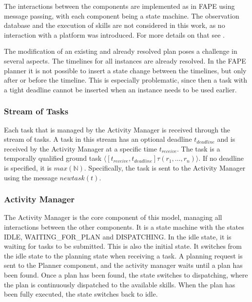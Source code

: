 
The interactions between the components are implemented as in FAPE using message passing, with each component being a state machine.
The observation database and the execution of skills are not considered in this work, as no interaction with a platform was introduced.
For more details on that see \cite{bit-monnotTemporalHierarchicalModels2016a}.

The modification of an existing and already resolved plan poses a challenge in several aspects.
The timelines for all instances are already resolved.
In the FAPE planner it is not possible to insert a state change between the timelines, but only after or before the timeline.
This is especially problematic, since then a task with a tight deadline cannot be inserted when an instance needs to be used earlier.

\subsubsection{Stream of Tasks}

Each task that is managed by the Activity Manager is received through the stream of tasks.
A task in this stream has an optional deadline $t_{deadline}$ and is received by the Activity Manager at a specific time $t_{receive}$.
The task is a temporally qualified ground task $\langle[t_{receive},t_{deadline}] \tau(r_1,\dots,r_n)\rangle$.
If no deadline is specified, it is $max(\mathbb{N})$.
Specifically, the task is sent to the Activity Manager using the message $newtask(t)$.

\subsubsection{Activity Manager}

The Activity Manager is the core component of this model, managing all interactions between the other components.
It is a state machine with the states IDLE, WAITING\_FOR\_PLAN and DISPATCHING.
In the idle state, it is waiting for tasks to be submitted.
This is also the initial state.
It switches from the idle state to the planning state when receiving a task.
A planning request is sent to the Planner component, and the activity manager waits until a plan has been found.
Once a plan has been found, the state switches to dispatching, where the plan is continuously dispatched to the available skills.
When the plan has been fully executed, the state switches back to idle.

